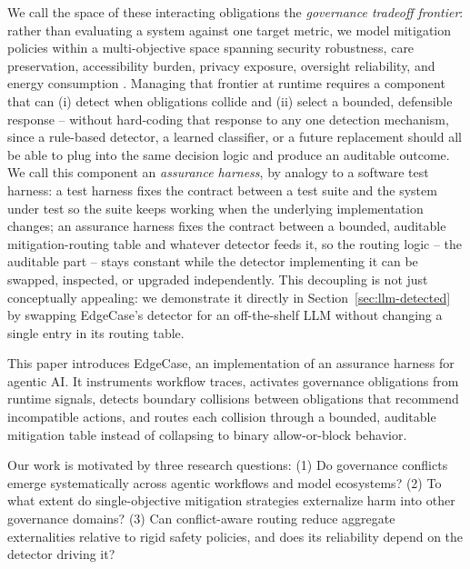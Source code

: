 \documentclass[letterpaper]{article} %
\begin{document}
We call the space of these interacting obligations the \emph{governance tradeoff frontier}: rather than evaluating a system against one target metric, we model mitigation policies within a multi-objective space spanning security robustness, care preservation, accessibility burden, privacy exposure, oversight reliability, and energy consumption \citep{deb2001multiobjective}. Managing that frontier at runtime requires a component that can (i) detect when obligations collide and (ii) select a bounded, defensible response -- without hard-coding that response to any one detection mechanism, since a rule-based detector, a learned classifier, or a future replacement should all be able to plug into the same decision logic and produce an auditable outcome. We call this component an \emph{assurance harness}, by analogy to a software test harness: a test harness fixes the contract between a test suite and the system under test so the suite keeps working when the underlying implementation changes; an assurance harness fixes the contract between a bounded, auditable mitigation-routing table and whatever detector feeds it, so the routing logic -- the auditable part -- stays constant while the detector implementing it can be swapped, inspected, or upgraded independently. This decoupling is not just conceptually appealing: we demonstrate it directly in Section~\ref{sec:llm-detected} by swapping EdgeCase's detector for an off-the-shelf LLM without changing a single entry in its routing table.

This paper introduces EdgeCase, an implementation of an assurance harness for agentic AI. It instruments workflow traces, activates governance obligations from runtime signals, detects boundary collisions between obligations that recommend incompatible actions, and routes each collision through a bounded, auditable mitigation table instead of collapsing to binary allow-or-block behavior.

Our work is motivated by three research questions: (1) Do governance conflicts emerge systematically across agentic workflows and model ecosystems? (2) To what extent do single-objective mitigation strategies externalize harm into other governance domains? (3) Can conflict-aware routing reduce aggregate externalities relative to rigid safety policies, and does its reliability depend on the detector driving it?
\end{document}
